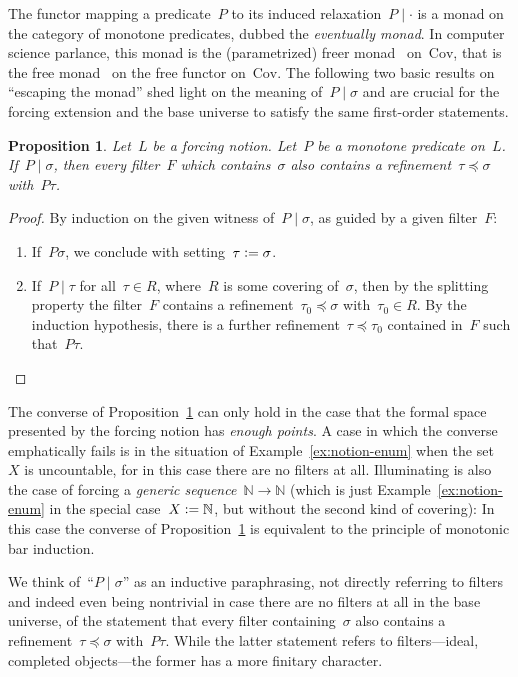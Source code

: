 \documentclass[com,11pt,crcready]{iosart2x}
\theoremstyle{definition}
\theoremstyle{plain}
\newtheorem{proposition}[definition]{Proposition}
\theoremstyle{remark}
\newcommand{\?}{\,{:}\,}
\newcommand{\NN}{\mathbb{N}}
\newcommand{\defeq}{\vcentcolon=}
\newcommand{\Cov}{\mathrm{Cov}}
\renewcommand{\_}{\mathpunct{.}\,}
\begin{document}
The functor mapping a predicate~$P$ to its induced
relaxation~$P\mid\cdot$ is a monad on the category of monotone predicates, dubbed the
\emph{eventually monad}. In computer science parlance, this monad is
the (parametrized) freer monad~\cite{kiselyov-ishii:freer,apfelmus:operational}
on~$\Cov$, that is the free monad~\cite[Section~6]{swierstra:carte}
on the free functor on~$\Cov$.
%
The following two basic results on ``escaping the monad'' shed light on the
meaning of~$P \mid \sigma$ and are crucial for the forcing extension and the
base universe to satisfy the same first-order statements.

\begin{proposition}\label{prop:ev-points}Let~$L$ be a forcing notion. Let~$P$
be a monotone predicate on~$L$. If~$P \mid \sigma$, then every filter~$F$ which
contains~$\sigma$ also contains a refinement~$\tau \preccurlyeq \sigma$
with~$P\tau$.
\end{proposition}

\begin{proof}By induction on the given witness of~$P \mid \sigma$, as guided by
a given filter~$F$:
\begin{enumerate}
\item If~$P\sigma$, we conclude with setting~$\tau \defeq \sigma$.
\item If~$P \mid \tau$ for all~$\tau \in R$, where~$R$ is some covering
of~$\sigma$, then by the splitting property the filter~$F$ contains a refinement~$\tau_0
\preccurlyeq \sigma$ with~$\tau_0 \in R$. By the induction hypothesis, there is a
further refinement~$\tau \preccurlyeq \tau_0$ contained in~$F$ such that~$P\tau$.\qedhere
\end{enumerate}
\end{proof}

The converse of Proposition~\ref{prop:ev-points} can only hold in the case that
the formal space presented by the forcing notion has \emph{enough points}.
A case in which the converse emphatically fails is in the situation of
Example~\ref{ex:notion-enum} when the set~$X$ is uncountable, for in this case
there are no filters at all. Illuminating is also the case of forcing a
\emph{generic sequence}~$\NN \to \NN$ (which is just
Example~\ref{ex:notion-enum} in the special case~$X \defeq \NN$, but without
the second kind of covering): In this case the converse of
Proposition~\ref{prop:ev-points} is equivalent to the principle of monotonic
bar induction.

We think of~``$P \mid \sigma$'' as an inductive paraphrasing, not directly referring to
filters and indeed even being nontrivial in case there are no filters at all in the base
universe, of the statement that every filter containing~$\sigma$ also contains
a refinement~$\tau \preccurlyeq \sigma$ with~$P\tau$. While the latter statement
refers to filters---ideal, completed objects---the former has a more finitary
character.
\end{document}
